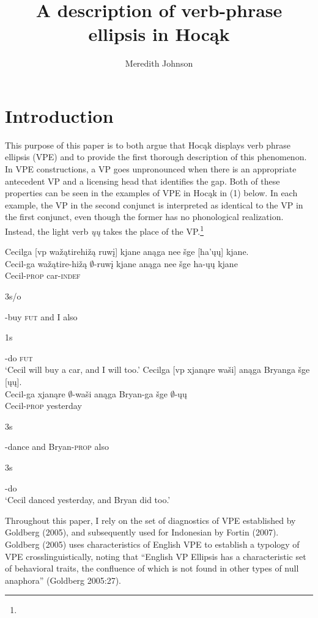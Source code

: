 \documentclass[output=paper]{LSP/langsci}
\author{Meredith Johnson}
\title{A description of verb-phrase ellipsis in Hoc\k{a}k}
\begin{document}
\section{Introduction}

This purpose of this paper is to both argue that Hoc\k{a}k displays verb phrase ellipsis (VPE) and to provide the first thorough description of this phenomenon. In VPE constructions, a VP goes unpronounced when there is an appropriate antecedent VP and a licensing head that identifies the gap. Both of these properties can be seen in the examples of VPE in Hoc\k{a}k in (1) below. In each example, the VP in the second conjunct is interpreted as identical to the VP in the first conjunct, even though the former has no phonological realization. Instead, the light verb \emph{\k{u}\k{u}} takes the place of the VP.\footnote{}


\begin{exe}
\ex
\begin{xlist}
\ex
\glll Cecilga {\textsc [vp} wa\v{z}\k{a}tirehi\v{z}\k{a} ruw\k{i}{\textsc ]} kjane an\k{a}ga nee \v{s}ge {\textsc [}ha'\k{u}\k{u}{\textsc ]} kjane.\\
Cecil-ga {} wa\v{z}\k{a}tire-hi\v{z}\k{a} $\emptyset$-ruw\k{i} kjane an\k{a}ga nee \v{s}ge ha-\k{u}\k{u} kjane\\
Cecil-\textsc{prop} {} car-\textsc{indef} \begin{sc}3s/o\end{sc}-buy \textsc{fut} and I also \begin{sc}1s\end{sc}-do \textsc{fut}\\
\trans `Cecil will buy a car, and I will too.' 
\ex
\glll Cecilga {\textsc [vp} xjan\k{a}re wa\v{s}i{\textsc ]} an\k{a}ga Bryanga \v{s}ge {\textsc [}\k{u}\k{u}{\textsc ]}.\\
Cecil-ga {} xjan\k{a}re $\emptyset$-wa\v{s}i an\k{a}ga Bryan-ga \v{s}ge $\emptyset$-\k{u}\k{u}\\
Cecil-\textsc{prop} {} yesterday \begin{sc}3s\end{sc}-dance and Bryan-\textsc{prop} also \begin{sc}3s\end{sc}-do\\
\trans `Cecil danced yesterday, and Bryan did too.'
\end{xlist}
\end{exe}


Throughout this paper, I rely on the set of diagnostics of VPE established by Goldberg (2005), and subsequently used for Indonesian by Fortin (2007). Goldberg (2005) uses characteristics of English VPE to establish a typology of VPE crosslinguistically, noting that ``English VP Ellipsis has a characteristic set of behavioral traits, the confluence of which is not found in other types of null anaphora'' (Goldberg 2005:27). 
\end{document}
